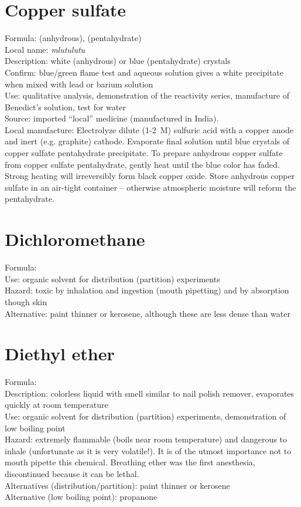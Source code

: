 \section{Copper sulfate}
Formula:  (anhydrous), 
 (pentahydrate)\\
Local name: \textit{mlutulutu}\\
Description: white (anhydrous) or blue (pentahydrate) crystals\\
Confirm: blue/green flame test 
and aqueous solution gives a white precipitate 
when mixed with lead or barium solution\\
Use: qualitative analysis, 
demonstration of the reactivity series, 
manufacture of Benedict's solution, 
test for water\\
Source: imported ``local'' medicine (manufactured in India).\\ 
Local manufacture: Electrolyze dilute (1-2~M) sulfuric acid 
with a copper anode and inert (e.g. 
graphite) cathode. 
Evaporate final solution until 
blue crystals of copper sulfate pentahydrate precipitate. 
To prepare anhydrous copper sulfate from copper sulfate pentahydrate, 
gently heat until the blue color has faded. 
Strong heating will irreversibly form black copper oxide. 
Store anhydrous copper sulfate in an air-tight container -- 
otherwise atmospheric moisture will reform the pentahydrate.

\section{Dichloromethane}
Formula: \\
Use: organic solvent for distribution (partition) experiments\\
Hazard: toxic by inhalation and ingestion (mouth pipetting) 
and by absorption though skin\\
Alternative: paint thinner or kerosene, 
although these are less dense than water

\section{Diethyl ether}
Formula: \\
Description: colorless liquid with smell similar to nail polish remover, 
evaporates quickly at room temperature\\
Use: organic solvent for distribution (partition) experiments, 
demonstration of low boiling point\\
Hazard: extremely flammable (boils near room temperature) 
and dangerous to inhale (unfortunate as it is very volatile!). 
It is of the utmost importance not to mouth pipette this chemical. 
Breathing ether was the first anesthesia, 
discontinued because it can be lethal.\\
Alternatives (distribution/partition): paint thinner or kerosene\\
Alternative (low boiling point): propanone

